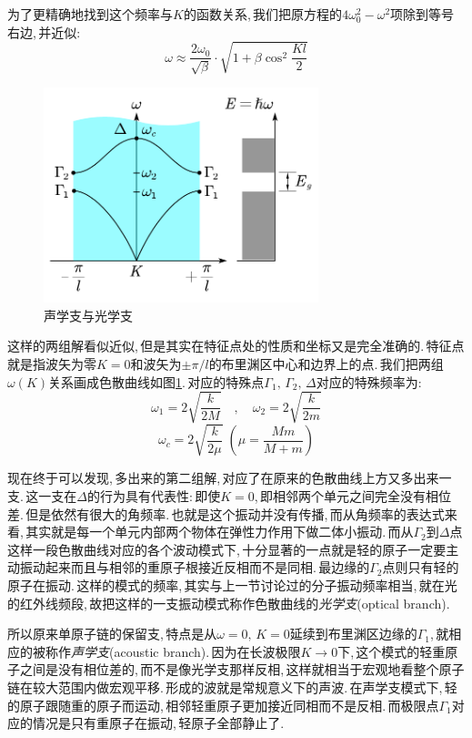 为了更精确地找到这个频率与$K$的函数关系,\,我们把原方程的$4\omega_0^2-\omega^2$项除到等号右边,\,并近似:
\[\omega\approx \frac{2\omega_0}{\sqrt{\beta}}\cdot\sqrt{1+\beta\cos^2\frac{Kl}{2}}\]

\begin{figure}
\centering
\vspace{-0.5cm}
\includegraphics[width=8cm]{image/6-3-16.png}
\caption{声学支与光学支}\label{6-3-16}
\end{figure}
这样的两组解看似近似,\,但是其实在特征点处的性质和坐标又是完全准确的.\,特征点就是指波矢为零$K=0$和波矢为$\pm \pi/l$的布里渊区中心和边界上的点.\,我们把两组$\omega(K)$关系画成色散曲线如图\ref{6-3-16}.\,对应的特殊点$\Gamma_1,\,\Gamma_2,\,\Delta$对应的特殊频率为:
\[\omega_1=2\sqrt{\frac{k}{2M}}\quad ,\quad \omega_2=2\sqrt{\frac{k}{2m}}\]
\[\omega_c=2\sqrt{\frac{k}{2\mu}}\;(\mu=\frac{Mm}{M+m})\]

现在终于可以发现,\,多出来的第二组解,\,对应了在原来的色散曲线上方又多出来一支.\,这一支在$\Delta$的行为具有代表性:\,即使$K=0$,\,即相邻两个单元之间完全没有相位差.\,但是依然有很大的角频率.\,也就是这个振动并没有传播,\,而从角频率的表达式来看,\,其实就是每一个单元内部两个物体在弹性力作用下做二体小振动.\,而从$\Gamma_2$到$\Delta$点这样一段色散曲线对应的各个波动模式下,\,十分显著的一点就是轻的原子一定要主动振动起来而且与相邻的重原子根接近反相而不是同相.\,最边缘的$\Gamma_2$点则只有轻的原子在振动.\,这样的模式的频率,\,其实与上一节讨论过的分子振动频率相当,\,就在光的红外线频段,\,故把这样的一支振动模式称作色散曲线的\emph{光学支}(optical branch).

所以原来单原子链的保留支,\,特点是从$\omega=0,\,K=0$延续到布里渊区边缘的$\Gamma_1$,\,就相应的被称作\emph{声学支}(acoustic branch).\,因为在长波极限$K\to 0$下,\,这个模式的轻重原子之间是没有相位差的,\,而不是像光学支那样反相,\,这样就相当于宏观地看整个原子链在较大范围内做宏观平移.\,形成的波就是常规意义下的声波.\,在声学支模式下,\,轻的原子跟随重的原子而运动,\,相邻轻重原子更加接近同相而不是反相.\,而极限点$\Gamma_1$对应的情况是只有重原子在振动,\,轻原子全部静止了.

